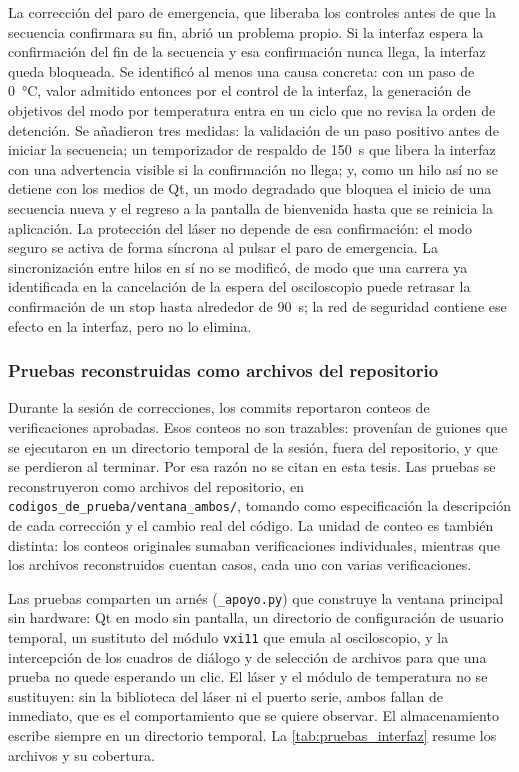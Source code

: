 La corrección del paro de emergencia, que liberaba los controles antes de que la
secuencia confirmara su fin, abrió un problema propio. Si la
interfaz espera la confirmación del fin de la secuencia y esa
confirmación nunca llega, la interfaz queda bloqueada. Se identificó
al menos una causa concreta: con un paso de \SI{0}{\celsius}, valor
admitido entonces por el control de la interfaz, la generación de
objetivos del modo por temperatura entra en un ciclo que no revisa la
orden de detención. Se añadieron tres medidas: la validación de un
paso positivo antes de iniciar la secuencia; un temporizador de
respaldo de \SI{150}{\second} que libera la interfaz con una
advertencia visible si la confirmación no llega; y, como un hilo así
no se detiene con los medios de Qt, un modo degradado que bloquea el
inicio de una secuencia nueva y el regreso a la pantalla de bienvenida
hasta que se reinicia la aplicación. La protección del láser no
depende de esa confirmación: el modo seguro se activa de forma
síncrona al pulsar el paro de emergencia. La sincronización entre
hilos en sí no se modificó, de modo que una carrera ya identificada en
la cancelación de la espera del osciloscopio puede retrasar la
confirmación de un stop hasta alrededor de \SI{90}{\second}; la red de
seguridad contiene ese efecto en la interfaz, pero no lo elimina.

\subsubsection*{Pruebas reconstruidas como archivos del repositorio}

Durante la sesión de correcciones, los commits reportaron conteos de
verificaciones aprobadas. Esos conteos no son trazables: provenían de
guiones que se ejecutaron en un directorio temporal de la sesión,
fuera del repositorio, y que se perdieron al terminar. Por esa razón
no se citan en esta tesis. Las pruebas se reconstruyeron como archivos
del repositorio, en \texttt{codigos\_de\_prueba/ventana\_ambos/},
tomando como especificación la descripción de cada corrección y el
cambio real del código. La unidad de conteo es también distinta: los
conteos originales sumaban verificaciones individuales, mientras que
los archivos reconstruidos cuentan casos, cada uno con varias
verificaciones.

Las pruebas comparten un arnés (\texttt{\_apoyo.py}) que construye la
ventana principal sin hardware: Qt en modo sin pantalla, un directorio
de configuración de usuario temporal, un sustituto del módulo
\texttt{vxi11} que emula al osciloscopio, y la intercepción de los
cuadros de diálogo y de selección de archivos para que una prueba no
quede esperando un clic. El láser y el módulo de temperatura no se
sustituyen: sin la biblioteca del láser ni el puerto serie, ambos
fallan de inmediato, que es el comportamiento que se quiere observar.
El almacenamiento escribe siempre en un directorio temporal. La
\cref{tab:pruebas_interfaz} resume los archivos y su cobertura.

